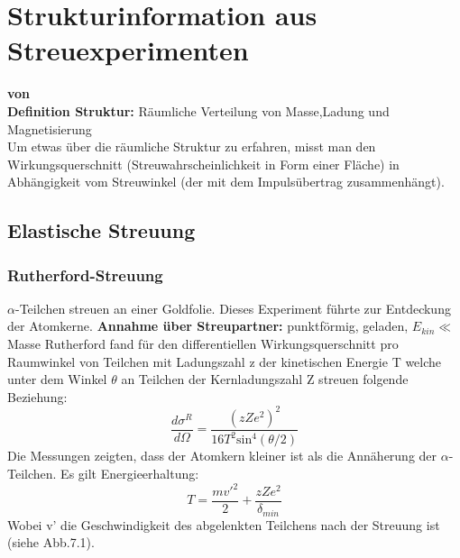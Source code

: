 \documentclass[Ex4_Zusammenfassung.tex]{subfiles}
\begin{document}
\chapter{Strukturinformation aus Streuexperimenten}
\textbf{von \martina} \\ 
 
\textbf{Definition Struktur:} 
Räumliche Verteilung von Masse,Ladung und Magnetisierung  \\ \newline 
Um etwas über die räumliche Struktur zu erfahren, misst man den Wirkungsquerschnitt (Streuwahrscheinlichkeit in Form einer Fläche) in Abhängigkeit vom Streuwinkel (der mit dem Impulsübertrag zusammenhängt). \newline

\section{Elastische Streuung}
\subsection{Rutherford-Streuung}
$\alpha$-Teilchen streuen an einer Goldfolie. Dieses Experiment führte zur Entdeckung der Atomkerne. \newline
\textbf{Annahme über Streupartner:} punktförmig, geladen, $E_{kin} \ll$ Masse \newline
Rutherford fand für den differentiellen Wirkungsquerschnitt pro Raumwinkel von Teilchen mit Ladungszahl z der kinetischen Energie T welche unter dem Winkel $\theta$  an Teilchen der Kernladungszahl Z streuen folgende Beziehung:
\begin{equation}
\frac{d\sigma^R}{d\Omega} = \frac{(zZe^2)^2}{16T^2 \text{sin}^4 (\theta/2)}
\end{equation}
Die Messungen zeigten, dass der Atomkern kleiner ist als die Annäherung der $\alpha$-Teilchen.
Es gilt Energieerhaltung:
\begin{equation}
T = \frac{mv'^2}{2} + \frac{zZe^2}{\delta_{min}}
\end{equation}
Wobei v' die Geschwindigkeit des abgelenkten Teilchens nach der Streuung ist (siehe Abb.7.1).
\end{document}
